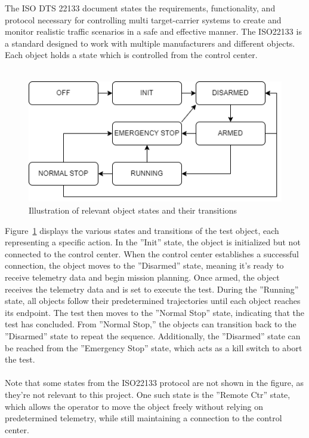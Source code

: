 The ISO DTS 22133 document states the requirements, functionality, and protocol necessary for controlling multi target-carrier systems to create and monitor realistic traffic scenarios in a safe and effective manner. The ISO22133 is a standard designed to work with multiple manufacturers and different objects. Each object holds a state which is controlled from the control center. 
\\ \\
\begin{figure}[H]
  \centering
  \includegraphics[scale=0.6]{figure/ISO-states.png}
  \caption{Illustration of relevant object states and their transitions}
  \label{fig:iso_states}
\end{figure}
Figure~\ref{fig:iso_states} displays the various states and transitions of the test object, each representing a specific action. In the ''Init'' state, the object is initialized but not connected to the control center. When the control center establishes a successful connection, the object moves to the ''Disarmed'' state, meaning it's ready to receive telemetry data and begin mission planning. Once armed, the object receives the telemetry data and is set to execute the test. During the ''Running'' state, all objects follow their predetermined trajectories until each object reaches its endpoint. The test then moves to the ''Normal Stop'' state, indicating that the test has concluded. From ''Normal Stop,'' the objects can transition back to the ''Disarmed'' state to repeat the sequence. Additionally, the ''Disarmed'' state can be reached from the ''Emergency Stop'' state, which acts as a kill switch to abort the test.
\\ \\
Note that some states from the ISO22133 protocol are not shown in the figure, as they're not relevant to this project. One such state is the ''Remote Ctr'' state, which allows the operator to move the object freely without relying on predetermined telemetry, while still maintaining a connection to the control center.
